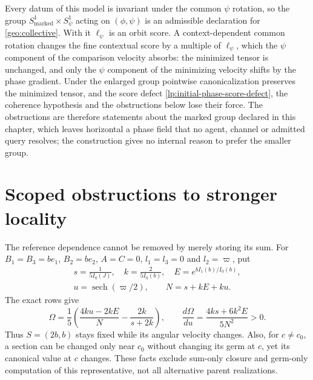 Every datum of this model is invariant under the common $\psi$ rotation, so the group $S^1_{\mathrm{marked}}\times S^1_\psi$ acting on $(\phi,\psi)$ is an admissible declaration for \cref{geo:collective}. With it $\ell_\psi$ is an orbit score. A context-dependent common rotation changes the fine contextual score by a multiple of $\ell_\psi$, which the $\psi$ component of the comparison velocity absorbs: the minimized tensor is unchanged, and only the $\psi$ component of the minimizing velocity shifts by the phase gradient. Under the enlarged group pointwise canonicalization preserves the minimized tensor, and the score defect \cref{lp:initial-phase-score-defect}, the coherence hypothesis and the obstructions below lose their force. The obstructions are therefore statements about the marked group declared in this chapter, which leaves horizontal a phase field that no agent, channel or admitted query resolves; the construction gives no internal reason to prefer the smaller group.

\section{Scoped obstructions to stronger locality}

The reference dependence cannot be removed by merely storing its sum. For $B_1=B_3=be_1$, $B_2=be_2$, $A=C=0$, $l_1=l_3=0$ and $l_2=\varpi$, put
\begin{equation}
 \begin{gathered}
 s=\frac1{5I_0(J)},\quad k=\frac2{5I_0(b)},\quad E=e^{bI_1(b)/I_0(b)},\\
 u=\operatorname{sech}(\varpi/2),\qquad N=s+kE+ku.
 \end{gathered}
 \label{lp:sum-example}
\end{equation}
The exact rows give
\begin{equation}
 \Omega=\frac15\left(\frac{4ku-2kE}{N}-\frac{2k}{s+2k}\right),\qquad
 \frac{d\Omega}{du}=\frac{4ks+6k^2E}{5N^2}>0.
 \label{lp:sum-failure}
\end{equation}
Thus $S=(2b,b)$ stays fixed while its angular velocity changes. Also, for $c\ne c_0$, a section can be changed only near $c_0$ without changing its germ at $c$, yet its canonical value at $c$ changes. These facts exclude sum-only closure and germ-only computation of this representative, not all alternative parent realizations.

